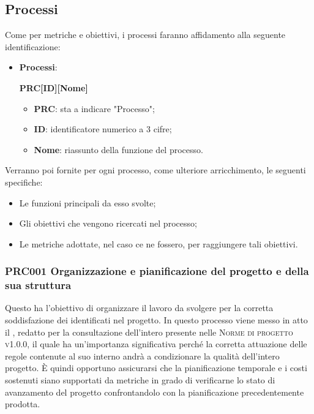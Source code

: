 \documentclass[../piano-di-qualifica.tex]{subfiles}
\begin{document}
\subsection{Processi}%
\label{sub:processi}
Come per metriche e obiettivi, i processi faranno affidamento alla seguente identificazione:
\begin{itemize}
    \item \textbf{Processi}: 
    \begin{center}
        \centering
        \textbf{PRC[ID][Nome]}
    \end{center}
    \begin{itemize}
        \item \textbf{PRC}: sta a indicare "Processo";
        \item \textbf{ID}: identificatore numerico a 3 cifre;
        \item \textbf{Nome}: riassunto della funzione del processo.
    \end{itemize}
\end{itemize}
Verranno poi fornite per ogni processo, come ulteriore arricchimento, le seguenti specifiche:
\begin{itemize}
    \item Le funzioni principali da esso svolte;
    \item Gli obiettivi che vengono ricercati nel processo;
    \item Le metriche adottate, nel caso ce ne fossero, per raggiungere tali obiettivi.
\end{itemize}

\subsubsection{PRC001 Organizzazione e pianificazione del progetto e della sua struttura}%
\label{sub:organizzazione_e_pianificazione_del_progetto_e_della_sua_struttura}
Questo  ha l'obiettivo di organizzare il lavoro da svolgere per la corretta soddisfazione dei  identificati nel progetto.
In questo processo viene messo in atto il , redatto per la consultazione dell'intero  presente nelle \textsc{Norme di progetto v1.0.0}, il quale ha un'importanza significativa perché la corretta attuazione delle regole contenute al suo interno andrà a condizionare la qualità dell'intero progetto.
È quindi opportuno assicurarsi che la pianificazione temporale e i costi sostenuti siano supportati da metriche in grado di verificarne lo stato di avanzamento del progetto confrontandolo con la pianificazione precedentemente prodotta.
\end{document}
